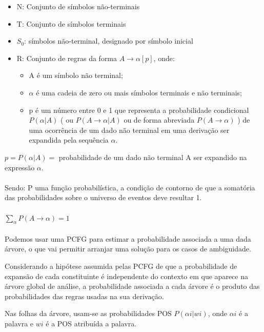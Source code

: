  \begin{itemize}

   \item N: Conjunto de símbolos não-terminais
   \item T: Conjunto de símbolos terminais
   \item $S_0$: símbolos não-terminal, designado por símbolo inicial
   \item R: Conjunto de regras da forma $ A \rightarrow \alpha [p] $, onde:

    \begin{itemize}
      \item A é um símbolo não terminal;
      \item  $\alpha$ é uma cadeia de zero ou mais símbolos terminais e não terminais;
      \item p é um número entre 0 e 1 que representa a probabilidade condicional $P(\alpha | A)$ ( ou $P(A \rightarrow \alpha | A)$  ou de forma abreviada $P(A \rightarrow \alpha)$ ) de uma ocorrência de um dado não terminal em uma derivação ser expandida pela sequência $\alpha$.
    \end{itemize}

 \end{itemize}


$p=P(\alpha |A) = $ probabilidade de um dado não terminal A ser expandido na expressão $ \alpha. $
\\ \\

Sendo: P uma função probabilística, a condição de contorno de que a somatória das probabilidades sobre o universo de eventos deve resultar  1.
\\ \\
$\sum_\alpha P(A \rightarrow \alpha)=1 $
\\ \\

Podemos usar uma PCFG para estimar a probabilidade associada a uma dada árvore, o que vai permitir arranjar uma solução para os casos de ambiguidade. 

Considerando a hipótese assumida pelas PCFG de que a probabilidade de expansão de cada constituinte é independente do contexto em que aparece na árvore global de análise, a probabilidade associada a cada árvore é o produto das probabilidades das regras usadas na sua derivação.

Nas folhas da árvore, usam-se as probabilidades POS $P(\alpha i|wi)$, onde  $\alpha i$ é a palavra e $wi$ é a POS atribuída a palavra.

